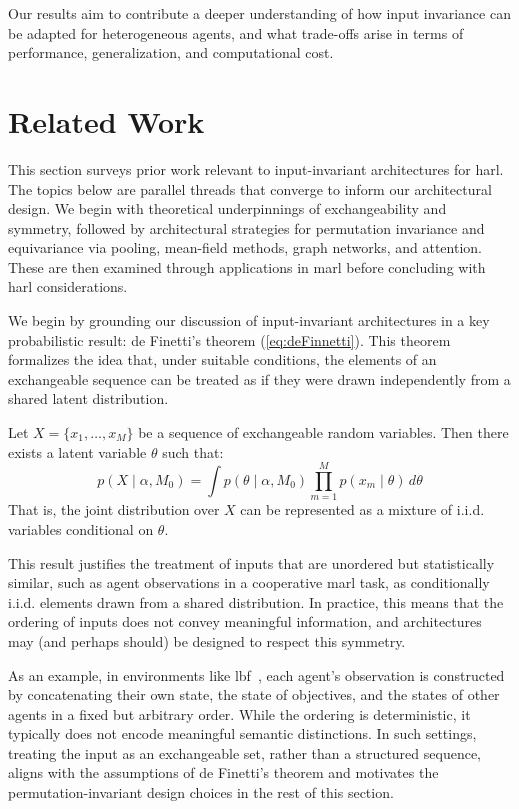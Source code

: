 Our results aim to contribute a deeper understanding of how 
input invariance can be adapted for heterogeneous agents, 
and what trade-offs arise in terms of performance, 
generalization, and computational cost.


\section{Related Work}

This section surveys prior work relevant to input-invariant architectures for \gls{harl}. 
The topics below are parallel threads that converge to inform our architectural design.
We begin with theoretical underpinnings of exchangeability and symmetry, 
followed by architectural strategies for permutation invariance and equivariance
via pooling, mean-field methods, graph networks, and attention. 
These are then examined through applications in \gls{marl} 
before concluding with \gls{harl} considerations.

We begin by grounding our discussion of input-invariant architectures 
in a key probabilistic result: de Finetti's theorem (\cref{eq:deFinnetti}). 
This theorem formalizes the idea that, under suitable conditions, 
the elements of an exchangeable sequence can be treated as if 
they were drawn independently from a shared latent distribution.

\begin{theorem}
    Let \(X = \{x_1, \ldots, x_M\}\) be a sequence of exchangeable random variables.
    Then there exists a latent variable \(\theta\) such that:
    \begin{equation}
        p(X \mid \alpha, M_0) = \int p(\theta \mid \alpha, M_0) 
        \prod_{m=1}^{M} p(x_m \mid \theta)\, d\theta
        \label{eq:deFinnetti}
    \end{equation}
    That is, the joint distribution over \(X\) can be represented as a mixture of 
    i.i.d. variables conditional on \(\theta\).
\end{theorem}

This result justifies the treatment of inputs that are unordered but statistically similar,
such as agent observations in a cooperative \gls{marl} task, 
as conditionally i.i.d. elements drawn from a shared distribution. 
In practice, this means that the ordering of inputs does not convey meaningful information, 
and architectures may (and perhaps should) be designed to respect this symmetry.

As an example, in environments like \gls{lbf}~\cite{papoudakis2021}, 
each agent's observation is constructed by concatenating their own state, 
the state of objectives, and the states of other agents in a fixed but arbitrary order. 
While the ordering is deterministic, it typically does not encode meaningful 
semantic distinctions. In such settings, treating the input as an exchangeable set,
rather than a structured sequence, aligns with the assumptions of de Finetti's theorem 
and motivates the permutation-invariant design choices in the rest of this section.

